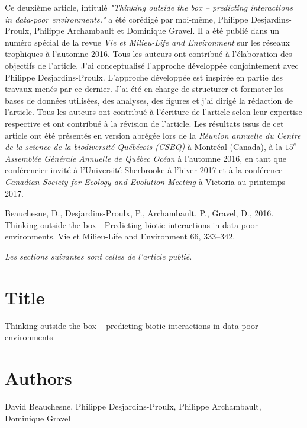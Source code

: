Ce deuxième article, intitulé \textit{"Thinking outside the box – predicting interactions in data-poor environments."} a été corédigé par moi-même, Philippe Desjardins-Proulx, Philippe Archambault et Dominique Gravel. Il a été publié dans un numéro spécial de la revue \textit{Vie et Milieu-Life and Environment} sur les réseaux trophiques à l'automne 2016. Tous les auteurs ont contribué à l'élaboration des objectifs de l'article. J'ai conceptualisé l'approche développée conjointement avec Philippe Desjardins-Proulx. L'approche développée est inspirée en partie des travaux menés par ce dernier. J'ai été en charge de structurer et formater les bases de données utilisées, des analyses, des figures et j'ai dirigé la rédaction de l'article. Tous les auteurs ont contribué à l'écriture de l'article selon leur expertise respective et ont contribué à la révision de l'article. Les résultats issus de cet article ont été présentés en version abrégée lors de la \textit{Réunion annuelle du Centre de la science de la biodiversité Québécois (CSBQ)} à Montréal (Canada), à la \textit{$15^e$ Assemblée Générale Annuelle de Québec Océan} à l'automne 2016, en tant que conférencier invité à l'Université Sherbrooke à l'hiver 2017 et à la conférence \textit{Canadian Society for Ecology and Evolution Meeting} à Victoria au printemps 2017. \linebreak[4]


\begin{singlespace}
  Beauchesne, D., Desjardins-Proulx, P., Archambault, P., Gravel, D., 2016. Thinking outside the box - Predicting biotic interactions in data-poor environments. Vie et Milieu-Life and Environment 66, 333–342.
\end{singlespace}


\textit{Les sections suivantes sont celles de l’article publié.}


\section{Title}

Thinking outside the box – predicting biotic interactions in data-poor environments

\section{Authors}

David Beauchesne, Philippe Desjardins-Proulx, Philippe Archambault, Dominique Gravel

